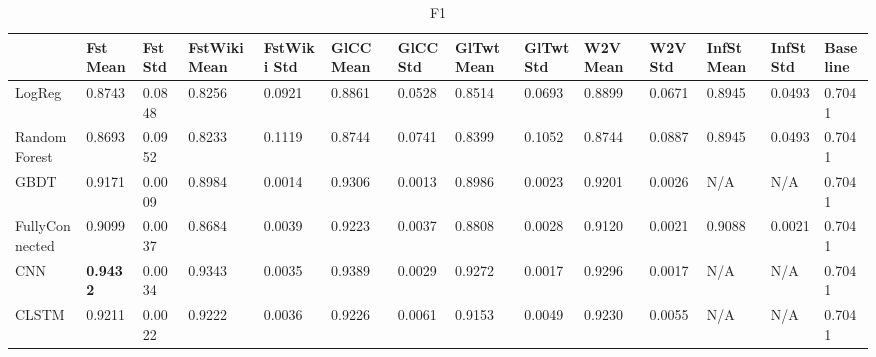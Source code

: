 \begin{table}[]
\centering
\caption{F1}
\label{f11}
\begin{adjustbox}{width=\textwidth}
\begin{tabular}{@{}|l|lllllllllllll@{}}
\multicolumn{1}{l|}{}                      & \multicolumn{1}{l|}{Fst Mean} & \multicolumn{1}{l|}{Fst Std} & \multicolumn{1}{l|}{FstWiki Mean} & \multicolumn{1}{l|}{FstWiki Std} & \multicolumn{1}{l|}{GlCC Mean} & \multicolumn{1}{l|}{GlCC Std} & \multicolumn{1}{l|}{GlTwt Mean} & \multicolumn{1}{l|}{GlTwt Std} & \multicolumn{1}{l|}{W2V Mean} & \multicolumn{1}{l|}{W2V Std} & \multicolumn{1}{l|}{InfSt Mean} & \multicolumn{1}{l|}{InfSt Std} & \multicolumn{1}{l|}{Baseline} \\ \midrule
LogReg        & 0.8743                        & 0.0848                       & 0.8256                            & 0.0921                           & 0.8861                         & 0.0528                        & 0.8514                          & 0.0693                         & 0.8899                        & 0.0671                       & 0.8945                          & 0.0493                         & 0.7041                        \\ \cmidrule(r){1-1}
Random Forest   & 0.8693                        & 0.0952                       & 0.8233                            & 0.1119                           & 0.8744                         & 0.0741                        & 0.8399                          & 0.1052                         & 0.8744                        & 0.0887                       & 0.8945                          & 0.0493                         & 0.7041                        \\ \cmidrule(r){1-1}
GBDT       & 0.9171                        & 0.0009                       & 0.8984                            & 0.0014                           & 0.9306                         & 0.0013                        & 0.8986                          & 0.0023                         & 0.9201                        & 0.0026                       & N/A                             & N/A                            & 0.7041                        \\ \cmidrule(r){1-1}
FullyConnected & 0.9099                        & 0.0037                       & 0.8684                            & 0.0039                           & 0.9223                         & 0.0037                        & 0.8808                          & 0.0028                         & 0.9120                        & 0.0021                       & 0.9088                          & 0.0021                         & 0.7041                        \\ 
\cmidrule(r){1-1}
CNN & {\bf 0.9432} &0.0034 &0.9343 &0.0035 & 0.9389 &0.0029 & 0.9272 &0.0017 & 0.9296 &0.0017 &N/A &N/A & 0.7041 \\
\cmidrule(r){1-1}
CLSTM & 0.9211 & 0.0022 & 0.9222 & 0.0036& 0.9226&0.0061& 0.9153& 0.0049&0.9230&0.0055&N/A&N/A& 0.7041 \\
\bottomrule
\end{tabular}
\end{adjustbox}
\end{table}

